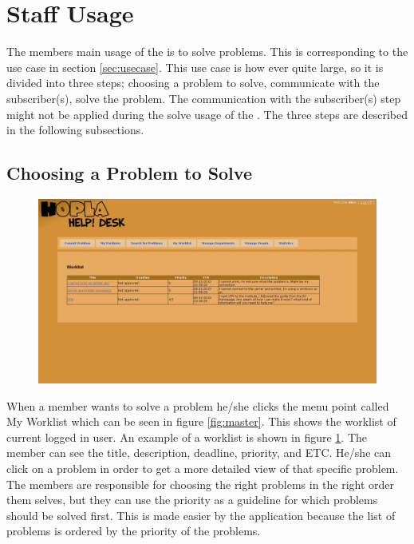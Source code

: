 \section{Staff Usage}
\label{sec:staff_usage}
The \astaff[] members main usage of the is to solve problems.
This is corresponding to the \ucsolproblem{} use case in section \ref{sec:usecase}.
This use case is how ever quite large, so it is divided into three steps; choosing a problem to solve, communicate with the subscriber(s), solve the problem.
The communication with the subscriber(s) step might not be applied during the solve usage of the \aclient[].
The three steps are described in the following subsections.

\subsection{Choosing a Problem to Solve}
\begin{figure}[htb]
	\centering
		\includegraphics[width=1.00\textwidth, clip=true, trim=4cm 10.5cm 8cm 8cm]{input/implementation/program_presentation/worklist.png}
	\label{fig:worklist}
\end{figure}

When a \astaff[] member wants to solve a problem he/she clicks the menu point called My Worklist which can be seen in figure \ref{fig:master}.
This shows the worklist of current logged in \astaff[] user.
An example of a worklist is shown in figure \ref{fig:worklist}.
The \astaff[] member can see the title, description, deadline, priority, and ETC.
He/she can click on a problem in order to get a more detailed view of that specific problem.
The \astaff[] members are responsible for choosing the right problems in the right order them selves, but they can use the priority as a guideline for which problems should be solved first.
This is made easier by the application because the list of problems is ordered by the priority of the problems.


